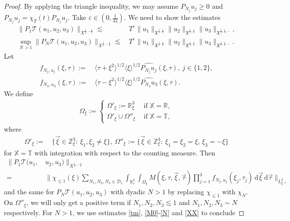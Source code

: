 \documentclass[reqno]{amsart}
\theoremstyle{Definitionl}
\theoremstyle{Definitionk}
\theoremstyle{definition}
\theoremstyle{Satzk}
\theoremstyle{Satzl}
\theoremstyle{Bemerkung}
\begin{document}
\begin{proof}
By applying the triangle inequality, we may assume $P_{N_j}u_j\ge0$ and $P_{N_j}u_j=\chi_T(t)P_{N_j}u_j$. Take $\varepsilon\in(0,\tfrac1{32})$. We need to show the estimates
\begin{align*}
\|P_{1}\mathcal T(u_1,u_2,u_3)\|_{X^{\frac12,-\frac12}}\lesssim&\, T^\varepsilon\|u_1\|_{\mathfrak X^{\frac12,\frac12}}\|u_2\|_{\mathfrak X^{\frac12,\frac12}}\|u_3\|_{\mathfrak X^{\frac12,\frac12,-}},\\
\sup_{N>1}\|P_N\mathcal T(u_1,u_2,u_3)\|_{X^{\frac12,-\frac12}}\lesssim&\, T^\varepsilon\|u_1\|_{\mathfrak X^{\frac12,\frac12}}\|u_2\|_{\mathfrak X^{\frac12,\frac12}}\|u_3\|_{\mathfrak X^{\frac12,\frac12,-}}.
\end{align*}
Let
\begin{align*}
f_{N_j,u_j}(\xi,\tau):=&\, \langle\tau+\xi^2\rangle^{1/2}\langle\xi\rangle^{1/2}\widehat{P_{N_j}u_j}(\xi,\tau),\ j\in\{1,2\},\\
f_{N_3,u_3}(\xi,\tau):=&\, \langle\tau-\xi^2\rangle^{1/2}\langle\xi\rangle^{1/2}\widehat{P_{N_3}u_3}(\xi,\tau).
\end{align*}
We define
\begin{align*}
\Omega_\xi:=\begin{cases}\Omega'_\xi:=\mathbb R^3_\xi\ &\,\text{if }\mathbb X=\mathbb R,\\
\Omega'_\xi\cup\Omega''_{\xi}\ &\,\text{if }\mathbb X=\mathbb T,
\end{cases}
\end{align*}
where
\begin{align*}
\Omega'_\xi:=&\, \{\vec\xi\in\mathbb Z^3_\xi:\ \xi_1,\xi_2\ne \xi\},\ 
\Omega''_\xi:= \{\vec\xi\in\mathbb Z^3_\xi:\ \xi_1=\xi_2=\xi,\,\xi_3=-\xi\}
\end{align*}
for $\mathbb X=\mathbb T$ with integration with respect to the counting measure. Then
\begin{align*}
\|P_{1}\mathcal T(u_1,&\,u_2,u_3)\|_{X^{\frac12,-\frac12}}\\
=&\, \Big\|\chi_{\le1}(\xi)\sum_{N_1,N_2,N_3\in\mathcal D_1}\int_{\mathbb R^3_\tau}\int_{\Omega_\xi}M(\xi,\tau,\vec\xi,\vec\tau)\prod_{j=1}^3f_{N_j,u_j}(\xi_j,\tau_j)\,\mathrm d\vec\xi\,\mathrm d\vec\tau\Big\|_{L^2_{\xi,\tau}}
\end{align*}
and the same for $P_N\mathcal T(u_1,u_2,u_3)$ with dyadic $N>1$ by replacing $\chi_{\le1}$ with $\chi_N$.\\[10pt]
On $\Omega''_\xi$, we will only get a positive term if $N_1,N_2,N_3\lesssim 1$ and $N_1,N_2,N_3\sim N$ respectively. For $N>1$, we use estimates \eqref{tm}, \eqref{M0}-\eqref{N} and \eqref{XX} to conclude

\end{proof}
\end{document}
